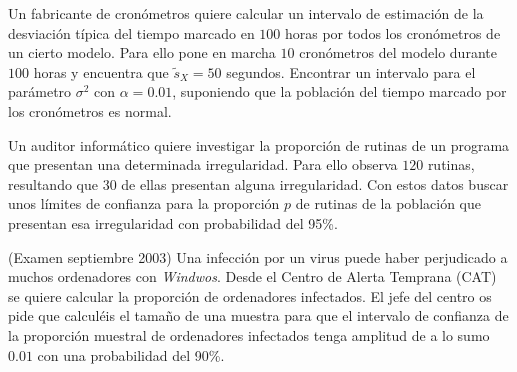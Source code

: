 \documentclass[12pt]{article}
\begin{document}
\begin{prob}
Un fabricante de cronómetros quiere calcular un intervalo de estimación de la desviación
típica del tiempo marcado en $100$ horas por todos los cronómetros  de un cierto modelo.
Para ello pone en marcha $10$ cronómetros del modelo durante $100$ horas y encuentra que
$\tilde{s}_{X}=50$ segundos. Encontrar un intervalo para el parámetro $\sigma^2$ con
$\alpha=0.01$, suponiendo que la población del tiempo marcado por los cronómetros es
normal. 
\end{prob}


\begin{prob}
Un auditor informático quiere investigar la proporción de rutinas de un programa que
presentan una determinada irregularidad. Para ello observa $120$ rutinas, resultando que
$30$ de ellas presentan alguna irregularidad. Con estos datos buscar unos límites de
confianza para la proporción $p$ de rutinas de la población que presentan esa irregularidad
con probabilidad del 95\%.

\end{prob}

%
%
\begin{prob}(Examen septiembre 2003) Una infección por un virus puede haber perjudicado a muchos ordenadores con
 \emph{Windwos}. Desde el
 Centro de Alerta Temprana (CAT) se quiere calcular la
 proporción de ordenadores infectados. El jefe del centro  os pide que calculéis
 el tamaño de una muestra para que el intervalo de confianza de la proporción muestral de
 ordenadores infectados tenga amplitud de a lo sumo $0.01$ con una probabilidad del 90\%.
  \end{prob}
\end{document}
